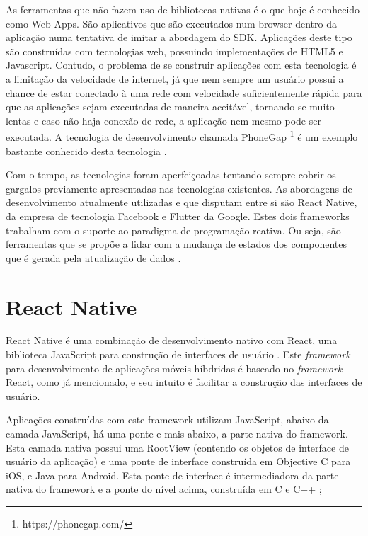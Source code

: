 As ferramentas que não fazem uso de bibliotecas nativas é o que hoje é conhecido como Web Apps. São aplicativos que são executados num browser dentro da aplicação numa tentativa de imitar a abordagem do SDK. Aplicações deste tipo são construídas com tecnologias web, possuindo implementações de HTML5 e Javascript. Contudo, o problema de se construir aplicações com esta tecnologia é a limitação da velocidade de internet, já que nem sempre um usuário possui a chance de estar conectado à uma rede com velocidade suficientemente rápida para que as aplicações sejam executadas de maneira aceitável, tornando-se muito lentas e caso não haja conexão de rede, a aplicação nem mesmo pode ser executada. A tecnologia de desenvolvimento chamada PhoneGap \footnote{https://phonegap.com/} é um exemplo bastante conhecido desta tecnologia \cite{clow2019flutter}.

Com o tempo, as tecnologias foram aperfeiçoadas tentando sempre cobrir os gargalos previamente apresentadas nas tecnologias existentes. As abordagens de desenvolvimento atualmente utilizadas e que disputam entre si são React Native, da empresa de tecnologia Facebook e Flutter da Google.
Estes dois frameworks trabalham com o suporte ao paradigma de programação reativa. Ou seja, são ferramentas que se propõe a lidar com a mudança de estados dos componentes que é gerada pela atualização de dados \cite{lima2019avaliacao}. 

\section{React Native}

React Native é uma combinação de desenvolvimento nativo com React, uma biblioteca JavaScript para construção de interfaces de usuário \cite{ReactNative}.
Este \textit{framework} para desenvolvimento de aplicações móveis híbdridas é baseado no \textit{framework} React, como já mencionado, e seu intuito é facilitar a construção das interfaces de usuário.

Aplicações construídas com este framework utilizam JavaScript, abaixo da camada JavaScript, há uma ponte e mais abaixo, a parte nativa do framework. Esta camada nativa possui uma RootView (contendo os objetos de interface de usuário da aplicação) e uma ponte de interface construída em Objective C para iOS, e Java para Android. Esta ponte de interface é intermediadora da parte nativa do framework e a ponte do nível acima, construída em C e C++ \cite{yatsenko2019comparative}; 

